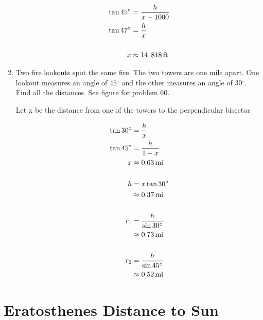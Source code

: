 \documentclass{exam}
\newcommand{\dg}{\ensuremath{^\circ}}
\begin{document}
\begin{enumerate}
      \begin{solution}
        \begin{align*}
          \tan 45 \dg &= \frac{h}{x + 1000} \\
          \tan 47 \dg &= \frac{h}{x} \\
          \\
          x &\approx \unit[14,818]{ft} \\
        \end{align*}
      \end{solution}

    \item Two fire lookouts spot the same fire.  The two towers are one mile apart.  One lookout measures an angle of
      $45 \dg$ and the other measures an angle of $30 \dg$.  Find all the distances.  See figure for problem 60.

      \begin{solution}
        Let x be the distance from one of the towers to the perpendicular bisector.

        \begin{align*}
          \tan 30 \dg & = \frac{h}{x} \\
          \tan 45 \dg & = \frac{h}{1 - x} \\
          x           & \approx \unit[0.63]{mi} \\
          \\
          h & = x \tan 30 \dg \\
            & \approx \unit[0.37]{mi} \\
          \\
          r_1 & = \frac{h}{\sin 30 \dg} \\
              & \approx \unit[0.73]{mi} \\
          \\
          r_2 & = \frac{h}{\sin 45 \dg} \\
              & \approx \unit[0.52]{mi} \\
        \end{align*}
      \end{solution}

  \end{enumerate}

  \section{Eratosthenes Distance to Sun}
\end{document}
